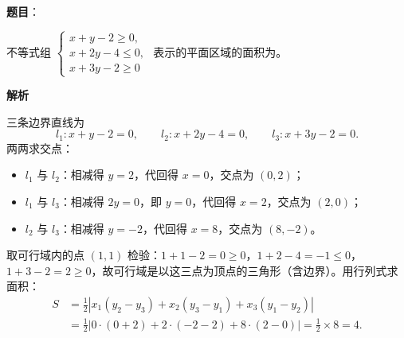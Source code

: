 \begin{answer}

\textbf{题目}：

不等式组 $\begin{cases}x+y-2\geqslant0,\\x+2y-4\leqslant0,\\x+3y-2\geqslant0\end{cases}$ 表示的平面区域的面积为\gkblank{}。

\textbf{解析}

三条边界直线为
\nopagebreak[4]
\[l_1:x+y-2=0,\qquad l_2:x+2y-4=0,\qquad l_3:x+3y-2=0 .\]
两两求交点：

\begin{itemize}
\item $l_1$ 与 $l_2$：相减得 $y=2$，代回得 $x=0$，交点为 $(0,2)$；
\item $l_1$ 与 $l_3$：相减得 $2y=0$，即 $y=0$，代回得 $x=2$，交点为 $(2,0)$；
\item $l_2$ 与 $l_3$：相减得 $y=-2$，代回得 $x=8$，交点为 $(8,-2)$。
\end{itemize}

取可行域内的点 $(1,1)$ 检验：$1+1-2=0\geqslant0$，$1+2-4=-1\leqslant0$，$1+3-2=2\geqslant0$，故可行域是以这三点为顶点的三角形（含边界）。用行列式求面积：
\nopagebreak[4]
\[\begin{aligned}
S&=\frac12\left|x_1(y_2-y_3)+x_2(y_3-y_1)+x_3(y_1-y_2)\right|\\
&=\frac12\left|0\cdot(0+2)+2\cdot(-2-2)+8\cdot(2-0)\right|=\frac12\times8=4 .
\end{aligned}\]


\end{answer}

